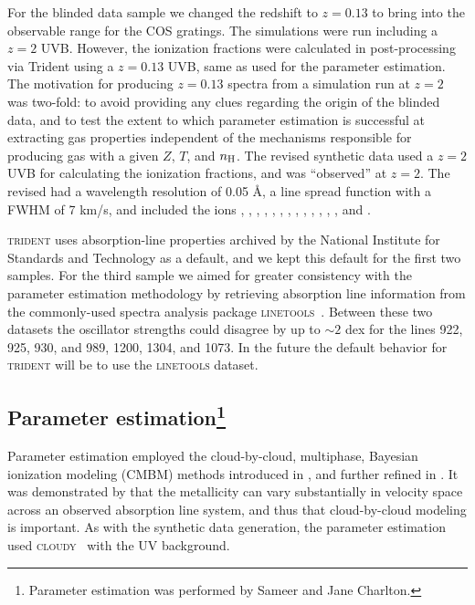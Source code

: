 \documentclass[fleqn,usenatbib]{mnras}
\newcommand{\todo}[1]{\textcolor{Maroon}{\textbf{Address: #1}}}
\begin{document}
For the blinded data sample we changed the redshift to $z=0.13$ to bring  into the observable range for the COS gratings.
The simulations were run including a $z=2$ UVB.
However, the ionization fractions were calculated in post-processing via Trident using a $z=0.13$ \cite{Haardt2012} UVB, same as used for the parameter estimation.
The motivation for producing $z=0.13$ spectra from a simulation run at $z=2$ was two-fold:
to avoid providing any clues regarding the origin of the blinded data,
and to test the extent to which parameter estimation is successful at extracting gas properties independent of the mechanisms responsible for producing gas with a given $Z$, $T$, and $n_{\rm H}$.
The revised synthetic data used a $z=2$ UVB for calculating the ionization fractions, and was ``observed'' at $z=2$.
The revised had a wavelength resolution of 0.05 \AA,
a line spread function with a FWHM of 7 km/s,
and included the ions , , , , , , , , , , , , , and .

\textsc{trident} uses absorption-line properties archived by the National Institute for Standards and Technology as a default, and we kept this default for the first two samples.
For the third sample we aimed for greater consistency with the parameter estimation methodology by retrieving absorption line information from the commonly-used spectra analysis package \textsc{linetools}~\citep{Prochaska2016}.
Between these two datasets the oscillator strengths could disagree by up to $\sim 2$ dex for the lines  922, 925, 930, and 989,  1200,  1304, and  1073.
In the future the default behavior for \textsc{trident} will be to use the \textsc{linetools} dataset.


\subsection[Parameter estimation]{Parameter estimation\footnote{
 Parameter estimation was performed by Sameer and Jane Charlton.}}
\label{s:  parameter estimation}

 Parameter estimation employed the cloud-by-cloud, multiphase, Bayesian ionization modeling (CMBM) methods introduced in \cite{Sameer2021}, and further refined in \cite{Sameer2022}.
 It was demonstrated by \cite{Zahedy2019} that the metallicity can vary substantially in velocity space across an observed absorption line system, and thus that cloud-by-cloud modeling is important.
 As with the synthetic data generation, the  parameter estimation used \textsc{cloudy}~\citep{Ferland2013} with the \cite{Haardt2012} UV background.
\end{document}

